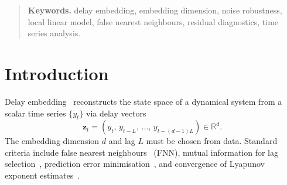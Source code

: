 
\maketitle

\begin{abstract}
Delay embedding parameter selection relies on diagnostics ---
false nearest neighbours, Jacobian-trace convergence, prediction
error --- that implicitly assume deterministic, noise-free
dynamics.  We show empirically that these criteria share a noise
threshold, above which they lose diagnostic value: for the
Lorenz-63 system, false nearest neighbour percentages at the
correct embedding dimension rise from $2\%$ (clean) to $62\%$
($5\%$ noise), while the Jacobian trace becomes uninformative.

We propose residual autocorrelation convergence --- the decrease
of lag-1 autocorrelation in local-linear-fit residuals as
embedding dimension increases --- as a noise-robust alternative.
This criterion correctly identifies sufficient embedding dimension
under $5$--$20\%$ observational noise where deterministic criteria
fail, and provides a U-shaped minimum for lag selection.  Results
are validated on the R\"{o}ssler system.

The computational primitive --- local linear regression in delay
coordinates --- is shared with S-maps~\cite{Sugihara1994} and
Jacobian-based Lyapunov estimation~\cite{SanoSawada1985}.  The
contribution is the application to embedding assessment and the
characterization of noise operating regimes.
\end{abstract}

\begin{quote}\small
\textbf{Keywords.}
delay embedding, embedding dimension, noise robustness, local
linear model, false nearest neighbours, residual diagnostics,
time series analysis.
\end{quote}

\section{Introduction}
\label{sec:intro}

Delay embedding~\cite{Takens1981, SauerYorkeCasdagli1991}
reconstructs the state space of a dynamical system from a scalar
time series $\{y_t\}$ via delay vectors
\begin{equation}\label{eq:delay}
  \mathbf{z}_t = (y_t,\, y_{t-L},\, \ldots,\, y_{t-(d-1)L})
  \in \mathbb{R}^d.
\end{equation}
The embedding dimension $d$ and lag $L$ must be chosen from data.
Standard criteria include false nearest
neighbours~\cite{KennelBrownAbarbanel1992} (FNN), mutual
information for lag selection~\cite{FraserSwinney1986},
prediction error minimisation~\cite{RagwitzKantz2002}, and
convergence of Lyapunov exponent
estimates~\cite{SanoSawada1985}.

